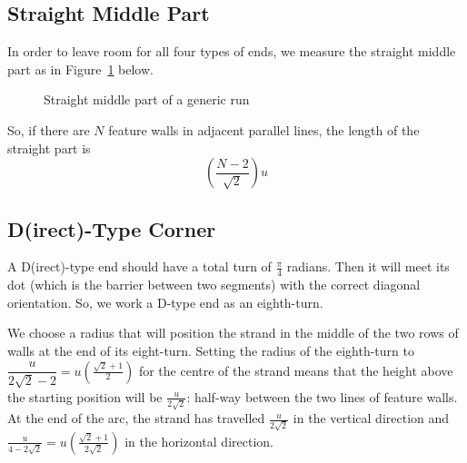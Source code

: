 \documentclass[openany]{book}
\begin{document}
\subsection{Straight Middle Part}

In order to leave room for all four types of ends, we measure the straight middle part as in Figure~\ref{fig:measureSR} below.
\begin{figure}[h]\centering
{}
\caption{Straight middle part of a generic run}\label{fig:measureSR}
\end{figure}

So, if there are $N$ feature walls in adjacent parallel lines, the length of the straight part is
\[\left(\frac{N-2}{\sqrt 2}\right)u\]

\subsection{D(irect)-Type Corner}

A D(irect)-type end should have a total turn of $\frac{\pi}{4}$ radians. Then it will meet its dot (which is the barrier between two segments) with the correct diagonal orientation.
So, we work a D-type end as an eighth-turn. 

We choose a radius that will position the strand in the middle of the two rows of walls at the end of its eight-turn. Setting the radius of the eighth-turn to  $\dfrac{u}{2\sqrt 2 -2} = u\left(\frac{\sqrt 2 +1}2\right)$ for the centre of the strand means that the height above the starting position will be $\frac{u}{2\sqrt 2}$: half-way between the two lines of feature walls. At the end of the arc, the strand has travelled $\frac{u}{2\sqrt 2}$ in the vertical direction and $\frac{u}{4-2\sqrt 2}=u\left(\frac{\sqrt 2 +1}{2\sqrt 2}\right)$ in the horizontal direction.
\end{document}
